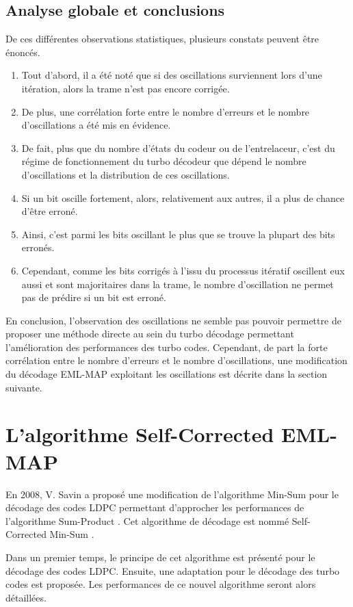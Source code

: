 \subsection{Analyse globale et conclusions}
De ces différentes observations statistiques, plusieurs constats peuvent être énoncés.
\begin{enumerate}
\item Tout d'abord, il a été noté que si des oscillations surviennent lors d'une itération, alors la trame n'est pas encore 
corrigée. 
\item De plus, une corrélation forte entre le nombre d'erreurs et le nombre d'oscillations a été mis en évidence. 
\item De fait, plus que du nombre d'états du codeur ou de l'entrelaceur, c'est du régime de fonctionnement du turbo décodeur que dépend
le nombre d'oscillations et la distribution de ces oscillations.
\item Si un bit oscille fortement, alors, relativement aux autres, il a plus de chance d'être erroné.
\item Ainsi, c'est parmi les bits oscillant le plus que se trouve la plupart des bits erronés.
\item Cependant, comme les bits corrigés à l'issu du processus itératif oscillent eux aussi et sont majoritaires dans la 
trame, le nombre d'oscillation ne permet pas de prédire si un bit est erroné.
\end{enumerate}

En conclusion, l'observation des oscillations ne semble pas pouvoir permettre de proposer une méthode directe au sein du 
turbo décodage permettant l'amélioration des performances des turbo codes. Cependant, de part la forte corrélation entre 
le nombre d'erreurs et le nombre d'oscillations, une modification du décodage EML-MAP exploitant les oscillations est décrite 
dans la section suivante.
\section{L’algorithme Self-Corrected EML-MAP}
En 2008, V. Savin  a proposé une modification de l'algorithme Min-Sum \cite{wiberg1996codes} pour le décodage des codes 
LDPC permettant d'approcher les performances de l'algorithme Sum-Product \cite{wiberg1996codes}. Cet algorithme de 
décodage est nommé Self-Corrected Min-Sum \cite{savin_sc}.

Dans un premier temps, le principe de cet algorithme est présenté pour le décodage des codes LDPC. Ensuite, une 
adaptation pour le décodage des turbo codes est proposée. Les performances de ce nouvel algorithme seront alors détaillées.

